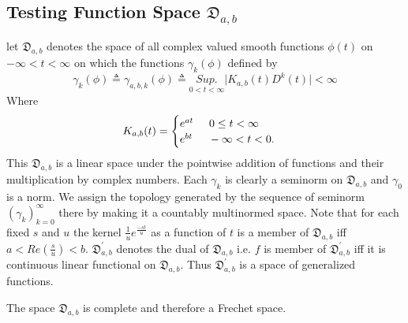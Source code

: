 \subsection{Testing Function Space $\mathfrak{D}  _{a,b}$}
 let $\mathfrak{D}_{a,b}$ denotes the space of all complex valued smooth functions $\phi(t)$ on $-\infty<t<\infty$ on which the functions $\gamma_{k}(\phi)$ defined by\\
 \begin{equation}
 \gamma_{k}(\phi)\triangleq \gamma_{a,b,k}(\phi)\triangleq \underset{0<t<\infty}{Sup.}\vert K_{a,b}(t)D^{k}(t)\vert <\infty
 \end{equation}
 Where \begin{align*}
  K_{a,b}(t) = \begin{cases}
  e^{at}\hspace{0.5cm}  0\leq t<\infty \\
  e^{bt}\hspace{0.5cm}  -\infty<t<0.
  \end{cases}
 \end{align*}
This $\mathfrak{D}_{a,b}$ is a linear space under the pointwise addition of functions and their multiplication by complex numbers. Each $\gamma_{k}$ is clearly a seminorm on $\mathfrak{D}_{a,b}$ and $\gamma_{0}$ is a norm. We assign the topology generated by the sequence of seminorm ${(\gamma_{k})}_{k=0}^{\infty}$ there by making it a countably multinormed space. Note that for each fixed $s$ and $u$ the kernel $\frac{1}{u}e^{\frac{-st}{u}}$ as a function of $t$ is a member of $\mathfrak{D}_{a,b}$ iff $ a<Re(\frac{s}{u})<b $. $\mathfrak{D}_{a,b}^{'}$ denotes the dual of $\mathfrak{D}_{a,b}$ i.e. $f$ is member of $\mathfrak{D}_{a,b}^{'}$ iff it is continuous linear functional on $\mathfrak{D}_{a,b}$. Thus $\mathfrak{D}_{a,b}^{'}$ is a space of generalized functions.
\begin{theorem}
The space $\mathfrak{D}_{a,b}$ is complete and therefore a Frechet space.
\end{theorem}
